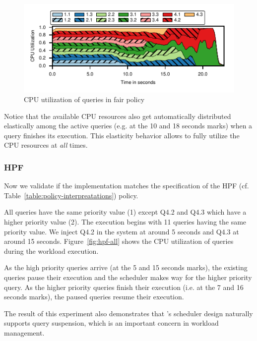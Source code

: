 \begin{figure}[t]
	\centering
	\includegraphics[width=\columnwidth]{policy/figures/ssb-all-uniform-fair-cpu-util.pdf}
	\caption{CPU utilization of queries in fair policy}
	\label{fig:fair-cpu-util}
\end{figure}

Notice that the available CPU resources also get automatically distributed elastically among the active queries (e.g. at the 10 and 18 seconds marks) when a query finishes its execution. 
This elasticity behavior allows \sys{} to fully utilize the CPU resources at \textit{all} times.
\subsubsection{HPF}
Now we validate if the implementation matches the 
specification of the HPF (cf. Table~\ref{table:policy-interpreatations}) policy.

All queries have the same priority value (1) except Q4.2 and Q4.3 which have a higher priority value (2). 
The execution begins with 11 queries having the same priority value. %
We inject Q4.2 in the system at around 5 seconds and Q4.3 at around 15 seconds.
Figure~\ref{fig:hpf-all} shows the CPU utilization of queries during the workload 
execution.

As the high priority queries arrive (at the 5 and 15 seconds marks), the existing queries pause their execution and the scheduler makes way for the higher priority query.
As the higher priority queries finish their execution (i.e. at the 7 and 16 seconds marks), the paused queries resume their execution.

The result of this experiment also demonstrates that \sys{}'s scheduler design naturally supports query suspension, which is an important concern in workload management. 

